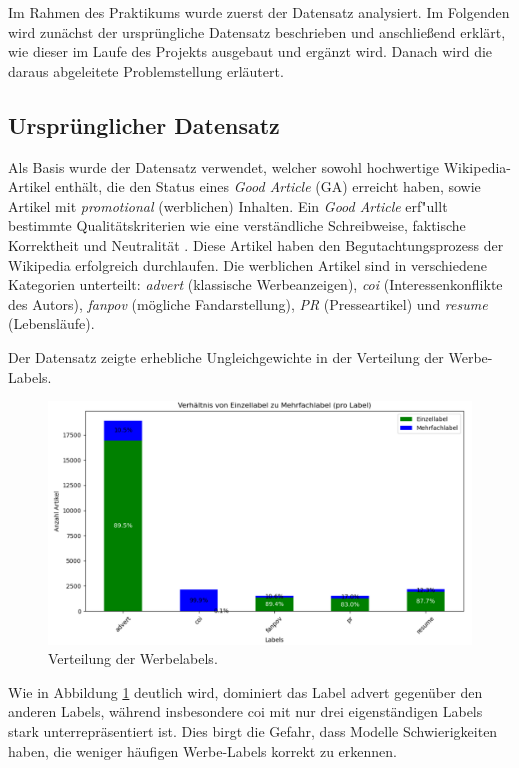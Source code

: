 
Im Rahmen des Praktikums wurde zuerst der Datensatz analysiert. Im Folgenden wird zunächst der ursprüngliche Datensatz beschrieben und anschließend erklärt, wie dieser im Laufe des Projekts ausgebaut und ergänzt wird. Danach wird die daraus abgeleitete Problemstellung erläutert.

\subsection{Ursprünglicher Datensatz}
\label{UrsprunglicherDatensatz}
Als Basis wurde der Datensatz \cite{Urbanbricks2020} verwendet, welcher sowohl hochwertige Wikipedia-Artikel enthält, die den Status eines \emph{Good Article} (GA) erreicht haben, sowie Artikel mit \textit{promotional} (werblichen) Inhalten. Ein \emph{Good Article} erf"ullt bestimmte Qualitätskriterien wie eine verständliche Schreibweise, faktische Korrektheit und Neutralität \cite{wiki}. Diese Artikel haben den Begutachtungsprozess der Wikipedia erfolgreich durchlaufen. Die werblichen Artikel sind in verschiedene Kategorien unterteilt: \emph{advert} (klassische Werbeanzeigen), \emph{coi} (Interessenkonflikte des Autors), \emph{fanpov} (mögliche Fandarstellung), \emph{PR} (Presseartikel) und \emph{resume} (Lebensläufe).

Der Datensatz zeigte erhebliche Ungleichgewichte in der Verteilung der Werbe-Labels.

\begin{figure}[H]
    \centering
    \includegraphics[width=0.7\linewidth]{figures/labelverteilung.png}
    \caption{Verteilung der Werbelabels.}
    \label{fig:labelverteilung}
\end{figure}

Wie in Abbildung \ref{fig:labelverteilung} deutlich wird, dominiert das Label advert gegenüber den anderen Labels, während insbesondere coi mit nur drei eigenständigen Labels stark unterrepräsentiert ist. Dies birgt die Gefahr, dass Modelle Schwierigkeiten haben, die weniger häufigen Werbe-Labels korrekt zu erkennen.
